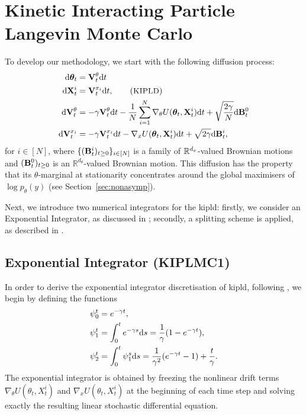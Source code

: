 
\section{Kinetic Interacting Particle Langevin Monte Carlo}\label{sec:algorithms}

To develop our methodology, we start with the following diffusion process:
\small
\begin{align}
\mathrm{d} \bm{\theta}_t &= \V^\theta_t \mathrm{d}t \nonumber \\
\mathrm{d} \X^i_t &= \V^{x_i}_t \mathrm{d}t, \tag{\text{\small\textsc{KIPLD}}}\label{eq:KIPLD}\\
\mathrm{d} \V^{\theta}_t &= -\gamma \V^{\theta}_t \mathrm{d}t - \frac{1}{N}\sum_{i=1}^N \nabla_\theta U(\bm{\theta}_t, \X^{i}_t) \mathrm{d} t + \sqrt{\frac{2\gamma}{N}}\mathrm{d}\B^0_t \nonumber\\
\mathrm{d} \V^{x_i}_t &= -\gamma \V_t^{x_i} \mathrm{d}t - \nabla_x U(\bm{\theta}_t, \X_t^i) \mathrm{d}t + \sqrt{2\gamma} \mathrm{d}\B_t^i, \nonumber
\end{align}
\normalsize
for $ i\in [N]$, where $\{({\mathbf B}_t^i)_{t\geq 0}\}_{i\in [N]}$ is a family of ${\mathbb R}^{d_x}$-valued Brownian motions and $({\mathbf B}_t^0)_{t\geq 0}$ is an $\mathbb{R}^{d_\theta}$-valued Brownian motion. This diffusion has the property that its $\theta$-marginal at stationarity concentrates around the global maximisers of $\log p_\theta(y)$ (see Section~\ref{sec:nonasymp}).


Next, we introduce two numerical integrators for the \gls*{kipld}: firstly, we consider an Exponential Integrator, as discussed in \citep{dalalyan2018sampling}; secondly, a splitting scheme is applied, as described in \citep{monmarche2021high}.

\subsection{Exponential Integrator (KIPLMC1)}\label{subsec:kiplmc1}

In order to derive the exponential integrator discretisation of \gls*{kipld}, following \citep{dalalyan2018sampling}, we begin by defining the functions
\begin{align*}
\psi_0^t &= e^{-\gamma t},\\
\psi_1^t &= \int_0^t e^{-\gamma s} {\mathrm d} s = \frac{1}{\gamma}(1-e^{-\gamma t}),\\
\psi_2^t &= \int_0^t \psi_1^s {\mathrm d} s
= \frac{1}{\gamma^2}(e^{-\gamma t}-1) + \frac{t}{\gamma}.
\end{align*}
The exponential integrator is obtained by freezing the nonlinear drift terms $\nabla_\theta U(\theta_t,X_t^i)$ and $\nabla_x U(\theta_t,X_t^i)$ at the beginning of each time step and solving exactly the resulting linear stochastic differential equation.

